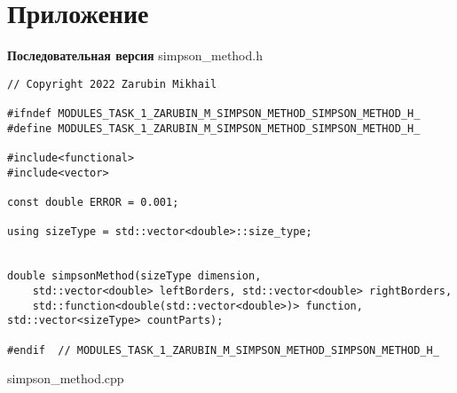 \documentclass{report}
\begin{document}
\section*{Приложение}
\textbf{Последовательная версия}
\newline
\newline simpson\_method.h
\begin{lstlisting}
// Copyright 2022 Zarubin Mikhail

#ifndef MODULES_TASK_1_ZARUBIN_M_SIMPSON_METHOD_SIMPSON_METHOD_H_
#define MODULES_TASK_1_ZARUBIN_M_SIMPSON_METHOD_SIMPSON_METHOD_H_

#include<functional>
#include<vector>

const double ERROR = 0.001;

using sizeType = std::vector<double>::size_type;


double simpsonMethod(sizeType dimension,
    std::vector<double> leftBorders, std::vector<double> rightBorders,
    std::function<double(std::vector<double>)> function, std::vector<sizeType> countParts);

#endif  // MODULES_TASK_1_ZARUBIN_M_SIMPSON_METHOD_SIMPSON_METHOD_H_

\end{lstlisting}
simpson\_method.cpp
\end{document}
